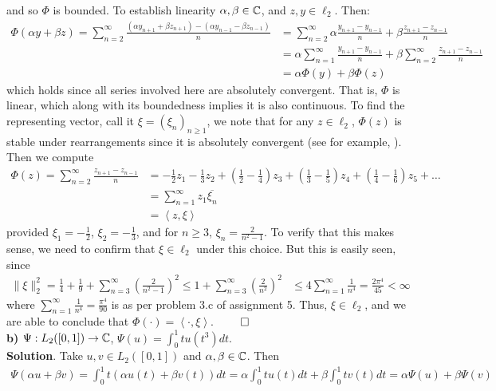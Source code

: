\documentclass[10pt]{article}
\newcommand{\1}[1]{\mathbbm{1}_{#1}} \newcommand{\mc}[1]{\mathcal{#1}}
\newcommand{\ip}[2]{\left\langle#1,#2\right\rangle }
\begin{document}
    and so $\Phi$ is bounded. To establish linearity $\alpha,\beta\in\mathbb{C}$, and $z,y\in\ell_2$. Then:
    \begin{align*}
        \Phi(\alpha y+\beta z)=\sum_{n=2}^\infty\frac{(\alpha y_{n+1}+\beta z_{n+1})-(\alpha y_{n-1}-\beta z_{n-1})}{n}&=\sum_{n=2}^\infty\alpha\frac{y_{n+1}-y_{n-1}}{n}+\beta\frac{z_{n+1}-z_{n-1}}{n}\\
        &=\alpha\sum_{n=1}^\infty\frac{y_{n+1}-y_{n-1}}{n}+\beta\sum_{n=2}^\infty\frac{z_{n+1}-z_{n-1}}{n}\\
        &=\alpha\Phi(y)+\beta\Phi(z)
    \end{align*}
    which holds since all series involved here are absolutely convergent. That is, $\Phi$ is linear, which along with its boundedness implies it is also continuous. To find the representing vector, call it $\xi=(\xi_n)_{n\geq 1}$, we note that for any $z\in\ell_2$, $\Phi(z)$ is stable under rearrangements
    since it is absolutely convergent (see for example, \cite[p.78, theorem 3.55]{Rudin_1976}). Then we compute
    \begin{align*}
        \Phi(z)=\sum_{n=2}^\infty\frac{z_{n+1}-z_{n-1}}{n}&=-\frac{1}{2}z_1-\frac{1}{3}z_2+\left(\frac{1}{2}-\frac{1}{4}\right)z_3+\left(\frac{1}{3}-\frac{1}{5}\right)z_4+\left(\frac{1}{4}-\frac{1}{6}\right)z_5+\dots\\
        &=\sum_{n=1}^\infty z_1\overline{\xi_n}\\
        &=\ip{z}{\xi}
    \end{align*}
    provided $\xi_1=-\frac{1}{2}$, $\xi_2=-\frac{1}{3}$, and for $n\geq 3$, $\xi_n=\frac{2}{n^2-1}$. To verify that this makes sense, we need to confirm that $\xi\in\ell_2$ under this choice. But this is easily seen, since
    \begin{align*}
        \|\xi\|_2^2=\frac{1}{4}+\frac{1}{9}+\sum_{n=3}^\infty\left(\frac{2}{n^2-1}\right)^2\leq 1+\sum_{n=3}^\infty\left(\frac{2}{n^2}\right)^2&\leq4\sum_{n=1}^\infty\frac{1}{n^4}=\frac{2\pi^4}{45}<\infty
    \end{align*}
    where $\sum_{n=1}^\infty\frac{1}{n^4}=\frac{\pi^4}{90}$ is as per problem 3.c of assignment 5. Thus, $\xi\in\ell_2$, and we are able to conclude that $\Phi(\cdot)=\ip{\cdot}{\xi}$. \hfill{$\qed$}\\[5pt]
    {\bf b)} $\Psi:L_2([0,1])\rightarrow\mathbb{C}$, $\Psi(u)=\int_0^1 tu(t^3)dt$.\\[5pt]
    {\bf Solution}. Take $u,v\in L_2([0,1])$ and $\alpha,\beta\in\mathbb{C}$. Then
    \begin{align*}
        \Psi(\alpha u+\beta v)=\int_0^1t(\alpha u(t)+\beta v(t))dt=\alpha\int_0^1tu(t)dt+\beta\int_0^1tv(t)dt=\alpha\Psi(u)+\beta\Psi(v)
    \end{align*}
\end{document}
